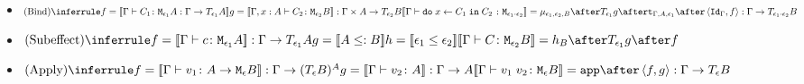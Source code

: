 {\begin{itemize}
        \item $\ntreeruleII{Bind}{f = \deno{\typerelation{\G}{C_1}{\M{\e_1}{A}} : \G \rightarrow \T{\e_1}{A}}}{{ g = \deno{\typerelation{\gax}{C_2}{\M{\e_2}{B}}}}: \G \times A \rightarrow \T{\e_2}{B}}{\deno{\typerelation{\G}{\doin{x}{C_1}{C_2}}{\M{\e_1 \dot \e_2}}} = \bind{\e_1}{\e_2}{B} \after \T{\e_1}{g} \after \tstrength{\G}{A}{\e_1} \after \pr{\idg}{f}: \G \rightarrow \T{\e_1 \dot \e_2}{B}}$ 
        
        \item  $\ntreeruleII{Subeffect}{f = \deno{\typerelation{\G}{c}{\M{\e_1}{A}}}: \G \rightarrow \T{\e_1}{A} }{ g = \deno{A \subtype B}}{ h = \dse{\e_1}{\e_2}}{\deno{\typerelation{\G}{C}{\M{\e_2}{B}}} = h_B \after \T{\e_1}{g} \after f}$
        \item $\ntreeruleII{Apply}{f = \deno{\gtyperelation{v_1}{\lamtype{A}{\e}B}}: \G \rightarrow (\teb)^{A} }{ g=\deno{\gtyperelation{v_2}{A}}: \G \rightarrow A}{\deno{\gtyperelation{\apply{v_1}{v_2}}{\meb}}= \app\after\pr{f}{g}: \G \rightarrow \teb }$
    \end{itemize}    
}
\ifdefined\NoDocument
\else
\documentclass{report}


    \Denotations

\fi